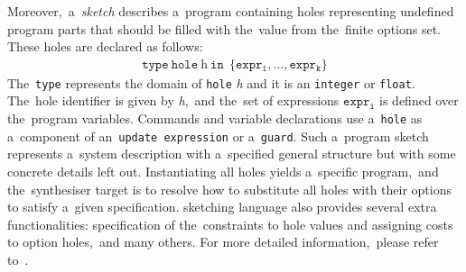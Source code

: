 Moreover,~a~\textit{sketch} describes a~program containing holes representing undefined program parts that should be filled with the~value from the~finite options set.
These holes are declared as follows:
\begin{align*}
    \texttt{type} \ \texttt{hole} \ \textit{h} \ \texttt{in} \ \ \{ \mathtt{expr_1}, \dots, \mathtt{expr_k} \}
\end{align*}
The~\texttt{type} represents the domain of \texttt{hole} \textit{h} and it is an \texttt{integer} or \texttt{float}.
The~hole identifier is given by \textit{h},~and the~set of expressions $\mathtt{expr_i}$ is defined over the~program variables.
Commands and variable declarations use a~\texttt{hole} as a~component of an~\texttt{update expression} or a~\texttt{guard}.
Such a~program sketch represents a~system description with a~specified general structure but with some concrete details left out.
Instantiating all holes yields a~specific program,~and the~synthesiser target is to resolve how to substitute all holes with their options to satisfy a~given specification.
\prism{} sketching language also provides several extra functionalities: specification of the~constraints to hole values and assigning costs to option holes,~and many others.
For more detailed information,~please refer to~\cite{cegis}.

